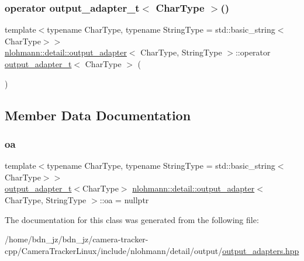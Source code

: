 \subsubsection{\texorpdfstring{operator output\+\_\+adapter\+\_\+t$<$ Char\+Type $>$()}{operator output\_adapter\_t< CharType >()}}
{\footnotesize\ttfamily template$<$typename Char\+Type, typename String\+Type = std\+::basic\+\_\+string$<$\+Char\+Type$>$$>$ \\
\hyperlink{classnlohmann_1_1detail_1_1output__adapter}{nlohmann\+::detail\+::output\+\_\+adapter}$<$ Char\+Type, String\+Type $>$\+::operator \hyperlink{namespacenlohmann_1_1detail_a9b680ddfb58f27eb53a67229447fc556}{output\+\_\+adapter\+\_\+t}$<$ Char\+Type $>$ (\begin{DoxyParamCaption}{ }\end{DoxyParamCaption})\hspace{0.3cm}{\ttfamily [inline]}}



\subsection{Member Data Documentation}
\mbox{\label{classnlohmann_1_1detail_1_1output__adapter_a323c18d74d6680faafec6dc3ace825e2}} 
\subsubsection{\texorpdfstring{oa}{oa}}
{\footnotesize\ttfamily template$<$typename Char\+Type, typename String\+Type = std\+::basic\+\_\+string$<$\+Char\+Type$>$$>$ \\
\hyperlink{namespacenlohmann_1_1detail_a9b680ddfb58f27eb53a67229447fc556}{output\+\_\+adapter\+\_\+t}$<$Char\+Type$>$ \hyperlink{classnlohmann_1_1detail_1_1output__adapter}{nlohmann\+::detail\+::output\+\_\+adapter}$<$ Char\+Type, String\+Type $>$\+::oa = nullptr\hspace{0.3cm}{\ttfamily [private]}}



The documentation for this class was generated from the following file\+:\begin{DoxyCompactItemize}
\item 
/home/bdn\+\_\+jz/bdn\+\_\+jz/camera-\/tracker-\/cpp/\+Camera\+Tracker\+Linux/include/nlohmann/detail/output/\hyperlink{output__adapters_8hpp}{output\+\_\+adapters.\+hpp}\end{DoxyCompactItemize}
